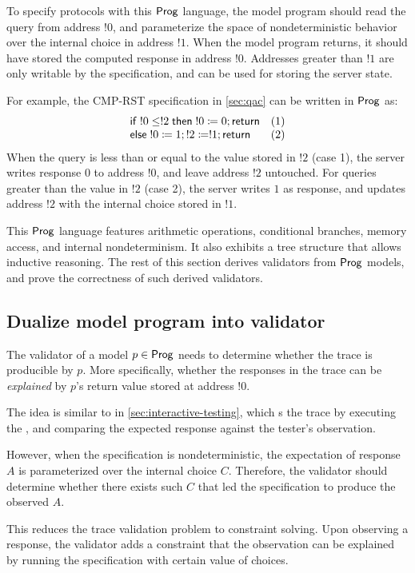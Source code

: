 To specify protocols with this $\mathsf{Prog}$ language, the model program should read
the query from address $!0$, and parameterize the space of nondeterministic
behavior over the internal choice in address $!1$.  When the model program
returns, it should have stored the computed response in address $!0$.  Addresses
greater than $!1$ are only writable by the specification, and can be used for
storing the server state.

For example, the CMP-RST specification in \autoref{sec:qac} can be written in
$\mathsf{Prog}$ as:
\[\begin{array}{ll}
\mathsf{if}\; !0\le!2\;\mathsf{then}\; !0\coloneqq0;\mathsf{return}&(1)\\
\mathsf{else}\;!0\coloneqq1;!2\coloneqq!1;\mathsf{return}&(2)
\end{array}\]
When the query is less than or equal to the value stored in $!2$ (case 1), the
server writes response $0$ to address $!0$, and leave address $!2$ untouched.
For queries greater than the value in $!2$ (case 2), the server writes $1$ as
response, and updates address $!2$ with the internal choice stored in $!1$.

This $\mathsf{Prog}$ language features arithmetic operations, conditional branches,
memory access, and internal nondeterminism.  It also exhibits a tree structure
that allows inductive reasoning.  The rest of this section derives validators
from $\mathsf{Prog}$ models, and prove the correctness of such derived validators.

\subsection{Dualize model program into validator}
The validator of a model $p\in\mathsf{Prog}$ needs to determine whether the trace is
producible by $p$.  More specifically, whether the responses in the trace can be
{\em explained} by $p$'s return value stored at address $!0$.

The idea is similar to  in \autoref{sec:interactive-testing}, which
s the trace by executing the , and comparing the
expected response against the tester's observation.

However, when the specification is nondeterministic, the expectation of response
$A$ is parameterized over the internal choice $C$.  Therefore, the validator
should determine whether there exists such $C$ that led the specification to
produce the observed $A$.

This reduces the trace validation problem to constraint solving.  Upon observing
a response, the validator adds a constraint that the observation can be
explained by running the specification with certain value of choices.

